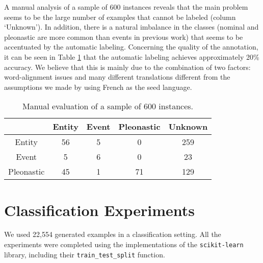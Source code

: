 \documentclass[10pt, a4paper]{article} \usepackage{lrec} \usepackage{multibib}
\begin{document}
A manual analysis of a sample of 600 instances reveals that the main problem 
seems to be the large number of examples that cannot be labeled (column `Unknown'). 
In addition, there is a natural imbalance in the classes (nominal and pleonastic are more
common than events in previous work) that seems to be accentuated by the
automatic labeling. Concerning the quality of the annotation, it can
be seen in Table \ref{tab:manualsample600} that the automatic labeling achieves
approximately 20\% accuracy. We believe that this is mainly due to the
combination of two factors: word-alignment issues and many different
translations different from the assumptions we made by using French as the seed language.  

\begin{table}[h!]\centering 
\begin{tabular}{ccccc} 
\toprule 
&Entity & Event &Pleonastic & Unknown \\ 
\midrule Entity &   56  &  5   &   0     &  259  \\ 
Event &    5  &  6   &  0  &  23\\ 
Pleonastic& 45 & 1&  71&  129\\
\bottomrule 
\end{tabular} \caption{Manual evaluation of a sample of 600
instances.}\label{tab:manualsample600} 
\end{table}




%
%
%
%
\section{Classification Experiments}

We used 22,554 generated examples in a classification setting. All the experiments were completed using the implementations of the \texttt{scikit-learn} library, including their \texttt{train\_test\_split} function. 
\end{document}
